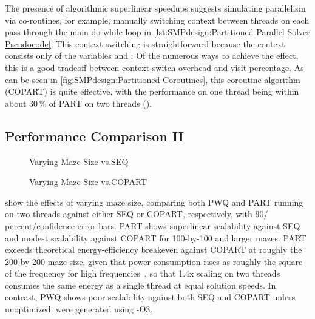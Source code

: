 The presence of algorithmic superlinear speedups suggests simulating
parallelism via co-routines, for example, manually switching context
between threads on each pass through the main do-while loop in
\cref{lst:SMPdesign:Partitioned Parallel Solver Pseudocode}.
This context switching is straightforward because the context
consists only of the variables  and :
Of the numerous ways to achieve the effect, this is a good tradeoff
between context-switch overhead and visit percentage.
As can be seen in
\cref{fig:SMPdesign:Partitioned Coroutines},
this coroutine algorithm (COPART) is quite effective, with the performance
on one thread being within about 30\,\% of PART on two threads
().

\subsection{Performance Comparison II}
\label{sec:SMPdesign:Performance Comparison II}

\begin{figure}
\centering
{}
\caption{Varying Maze Size vs.\@ SEQ}
\label{fig:SMPdesign:Varying Maze Size vs. SEQ}
\end{figure}

\begin{figure}
\centering
{}
\caption{Varying Maze Size vs.\@ COPART}
\label{fig:SMPdesign:Varying Maze Size vs. COPART}
\end{figure}

show the effects of varying maze size, comparing both PWQ and PART
running on two threads
against either SEQ or COPART, respectively, with 90\=/percent\-/confidence
error bars.
PART shows superlinear scalability against SEQ and modest scalability
against COPART for 100-by-100 and larger mazes.
PART exceeds theoretical energy-efficiency breakeven against COPART at roughly
the 200-by-200 maze size, given that power consumption rises as roughly
the square of the frequency for high frequencies~\cite{TrevorMudge2000Power},
so that 1.4x scaling on two threads consumes the same energy
as a single thread at equal solution speeds.
In contrast, PWQ shows poor scalability against both SEQ and COPART
unless unoptimized:
were generated using -O3.

